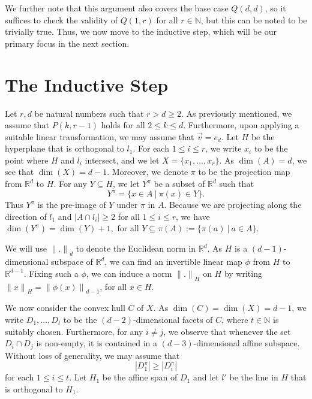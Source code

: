 We further note that this argument also covers the base case $Q(d,d)$, so it suffices to check the validity of $Q(1,r)$ for all $r \in \mathbb{N}$, but this can be noted to be trivially true. Thus, we now move to the inductive step, which will be our primary focus in the next section.





\section{The Inductive Step}

Let $r,d$ be natural numbers such that $r > d \geq 2$. As previously mentioned, we assume that $P(k,r-1)$ holds for all $2 \leq k \leq d$. Furthermore, upon applying a suitable linear transformation, we may assume that $\vec{v} = e_d$. Let $H$ be the hyperplane that is orthogonal to $l_1$. For each $1 \leq i \leq r$, we write $x_i$ to be the point where $H$ and $l_i$ intersect, and we let $X = \{ x_1, \dots, x_r \}$. As $\dim(A) = d$, we see that $\dim(X) = d-1.$ Moreover, we denote $\pi$ to be the projection map from $\mathbb{R}^d$ to $H$. For any $Y \subseteq H$, we let $Y^{\pi}$ be a subset of $\mathbb{R}^d$ such that
\[Y^{\pi} = \{ x \in A \ | \ \pi(x) \in Y \}. \]
Thus $Y^{\pi}$ is the pre-image of $Y$ under $\pi$ in $A$. Because we are projecting along the direction of $l_1$ and $|A \cap l_i| \geq 2$ for all $1 \leq i \leq r$, we have $\dim(Y^{\pi}) = \dim(Y) + 1,$ for all $Y \subseteq \pi(A) := \{ \pi(a) \ | \ a \in A \} $. 
\par

We will use ${\|.\|}_d$ to denote the Euclidean norm in $\mathbb{R}^d$. As $H$ is a $(d-1)$-dimensional subspace of $\mathbb{R}^d$, we can find an invertible linear map $\phi$ from $H$ to $\mathbb{R}^{d-1}$. Fixing such a $\phi$, we can induce a norm ${\|.\|}_H$ on $H$ by writing ${\|x\|}_H = {\|\phi(x) \|}_{d-1}$, for all $x \in H$. 
\par

We now consider the convex hull $C$ of $X$. As $\dim(C) = \dim(X) = d-1$, we write $D_1, \dots, D_{t}$ to be the $(d-2)$-dimensional facets of $C$, where $t \in \mathbb{N}$ is suitably chosen. Furthermore, for any $i \neq j$, we observe that whenever the set $D_i \cap D_j$ is non-empty, it is contained in a $(d-3)$-dimensional affine subspace. Without loss of generality, we may assume that
\begin{equation} \label{34los}
| D_1^{\pi} | \geq |D_i^{\pi}| 
\end{equation}
for each $1 \leq i \leq t$. Let $H_1$ be the affine span of $D_1$ and let $l'$ be the line in $H$ that is orthogonal to $H_1$. 
\par

